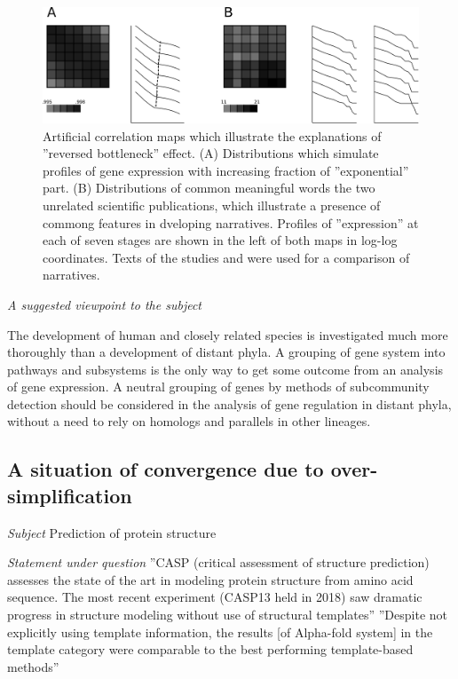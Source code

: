 \documentclass[12pt,aps]{revtex4}
\begin{document}
\begin{figure}[h]
\centerline{\includegraphics[width=0.95\columnwidth]{development.png}}
\caption{Artificial correlation maps which illustrate the explanations of ''reversed bottleneck'' effect.
(A) Distributions which simulate profiles of gene expression with increasing fraction of ''exponential'' part.
(B) Distributions of common meaningful words the two unrelated scientific publications, which illustrate a presence of commong features in dveloping narratives. Profiles of ''expression'' at each of seven stages are shown in the left of both maps in log-log coordinates. Texts of the studies \cite{CE2} and \cite{CR2} were used for a comparison of narratives.
}
\label{development}
\end{figure}

\emph{A suggested viewpoint to the subject}

The development of human and closely related species is investigated much more thoroughly than a development of distant phyla. A grouping of gene system into pathways and subsystems is the only way to get some outcome from an analysis of gene expression. A neutral grouping of genes by methods of subcommunity detection should be considered in the analysis of gene regulation in distant phyla, without a need to rely on homologs and parallels in other lineages.

\subsection{A situation of convergence due to over-simplification}

\emph{Subject} Prediction of protein structure

\emph{Statement under question} ''CASP (critical assessment of structure prediction) assesses the state of the art in modeling protein structure from amino acid sequence. The most recent experiment (CASP13 held in 2018) saw dramatic progress in structure modeling without use of structural templates'' \cite{CC1} ''Despite not explicitly using template information, the results [of Alpha-fold system] in the template category were comparable to the best performing template-based methods'' \cite{CC2}
\end{document}
